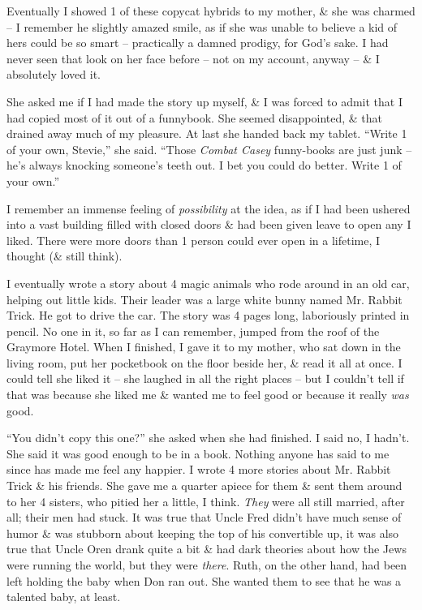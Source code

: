 \documentclass{article}
\numberwithin{equation}{section}
\begin{document}
Eventually I showed 1 of these copycat hybrids to my mother, \& she was charmed -- I remember he slightly amazed smile, as if she was unable to believe a kid of hers could be so smart -- practically a damned prodigy, for God's sake. I had never seen that look on her face before -- not on my account, anyway -- \& I absolutely loved it.

She asked me if I had made the story up myself, \& I was forced to admit that I had copied most of it out of a funnybook. She seemed disappointed, \& that drained away much of my pleasure. At last she handed back my tablet. ``Write 1 of your own, Stevie,'' she said. ``Those \textit{Combat Casey} funny-books are just junk -- he's always knocking someone's teeth out. I bet you could do better. Write 1 of your own.''

I remember an immense feeling of \textit{possibility} at the idea, as if I had been ushered into a vast building filled with closed doors \& had been given leave to open any I liked. There were more doors than 1 person could ever open in a lifetime, I thought (\& still think).

I eventually wrote a story about 4 magic animals who rode around in an old car, helping out little kids. Their leader was a large white bunny named Mr. Rabbit Trick. He got to drive the car. The story was 4 pages long, laboriously printed in pencil. No one in it, so far as I can remember, jumped from the roof of the Graymore Hotel. When I finished, I gave it to my mother, who sat down in the living room, put her pocketbook on the floor beside her, \& read it all at once. I could tell she liked it -- she laughed in all the right places -- but I couldn't tell if that was because she liked me \& wanted me to feel good or because it really \textit{was} good.

``You didn't copy this one?'' she asked when she had finished. I said no, I hadn't. She said it was good enough to be in a book. Nothing anyone has said to me since has made me feel any happier. I wrote 4 more stories about Mr. Rabbit Trick \& his friends. She gave me a quarter apiece for them \& sent them around to her 4 sisters, who pitied her a little, I think. \textit{They} were all still married, after all; their men had stuck. It was true that Uncle Fred didn't have much sense of humor \& was stubborn about keeping the top of his convertible up, it was also true that Uncle Oren drank quite a bit \& had dark theories about how the Jews were running the world, but they were \textit{there}. Ruth, on the other hand, had been left holding the baby when Don ran out. She wanted them to see that he was a talented baby, at least.
\end{document}
